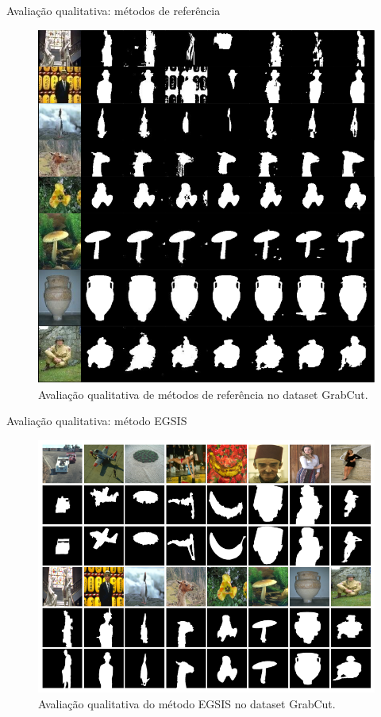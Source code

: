 \documentclass{templatebeamerufc/libs/ufc_format}
\begin{document}
\begin{frame}{Avaliação qualitativa: métodos de referência}
  \begin{figure}\label{fig:grabcut-comparacao-split2}
    \centering
    \caption{Avaliação qualitativa de métodos de referência no dataset GrabCut.}
    \includegraphics[scale=0.325]{figuras/grabcut-comparacao-split2}
  \end{figure}
\end{frame}

\begin{frame}{Avaliação qualitativa: método EGSIS}
  \begin{figure}\label{fig:egsis-qualitativa}
    \centering
    \caption{Avaliação qualitativa do método EGSIS no dataset GrabCut.}
    \includegraphics[scale=0.43]{figuras/egsis-qualitativa-transposto}
  \end{figure}
\end{frame}
\end{document}
